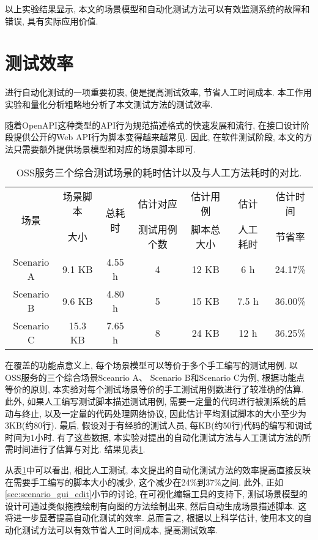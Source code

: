         以上实验结果显示, 本文的场景模型和自动化测试方法可以有效监测系统的故障和错误, 具有实际应用价值.
    
    \section{测试效率}

        进行自动化测试的一项重要初衷, 便是提高测试效率, 节省人工时间成本. 本工作用实验和量化分析粗略地分析了本文测试方法的测试效率.
        
        随着OpenAPI这种类型的API行为规范描述格式的快速发展和流行, 在接口设计阶段提供公开的Web API行为脚本变得越来越常见. 因此, 在软件测试阶段, 本文的方法只需要额外提供场景模型和对应的场景脚本即可.
        
        \begin{table}[!htb]
            \centering
            \small
            \begin{tabular}{ccc|ccc|c}
                \toprule
                \multirow{2}{*}{场景} & 场景脚本 & \multirow{2}{*}{总耗时} & 估计对应     & 估计用例   & 估计     & 估计时间  \\
                                      & 大小     &                         & 测试用例个数 & 脚本总大小 & 人工耗时 & 节省率 \\
                \midrule
                Scenario A & 9.1 KB & 4.55 h & 4 & 12 KB & 6 h & 24.17\% \\
                Scenario B & 9.6 KB & 4.80 h & 5 & 15 KB & 7.5 h & 36.00\% \\
                Scenario C & 15.3 KB & 7.65 h & 8 & 24 KB & 12 h & 36.25\% \\
                \bottomrule
            \end{tabular}
            \caption{OSS服务三个综合测试场景的耗时估计以及与人工方法耗时的对比.}
            \label{tab:efficiency_esti}
        \end{table}
        
        在覆盖的功能点意义上, 每个场景模型可以等价于多个手工编写的测试用例. 以OSS服务的三个综合场景Sceanrio A、 Scenario B和Scenario C为例, 根据功能点等价的原则, 本实验对每个测试场景等价的手工测试用例数进行了较准确的估算. 此外, 如果人工编写测试脚本描述测试用例, 需要一定量的代码进行被测系统的启动与终止, 以及一定量的代码处理网络协议, 因此估计平均测试脚本的大小至少为3KB(约80行). 最后, 假设对于有经验的测试人员, 每KB(约50行)代码的编写和调试时间为1小时. 有了这些数据, 本实验对提出的自动化测试方法与人工测试方法的所需时间进行了估算与对比. 结果见表\ref{tab:efficiency_esti}.
        
        从表\ref{tab:efficiency_esti}中可以看出, 相比人工测试, 本文提出的自动化测试方法的效率提高直接反映在需要手工编写的脚本大小的减少, 这个减少在24\%到37\%之间. 此外, 正如\ref{sec:scenario_gui_edit}小节的讨论, 在可视化编辑工具的支持下, 测试场景模型的设计可通过类似拖拽绘制有向图的方法绘制出来, 然后自动生成场景描述脚本. 这将进一步显著提高自动化测试的效率. 总而言之, 根据以上科学估计, 使用本文的自动化测试方法可以有效节省人工时间成本, 提高测试效率.
